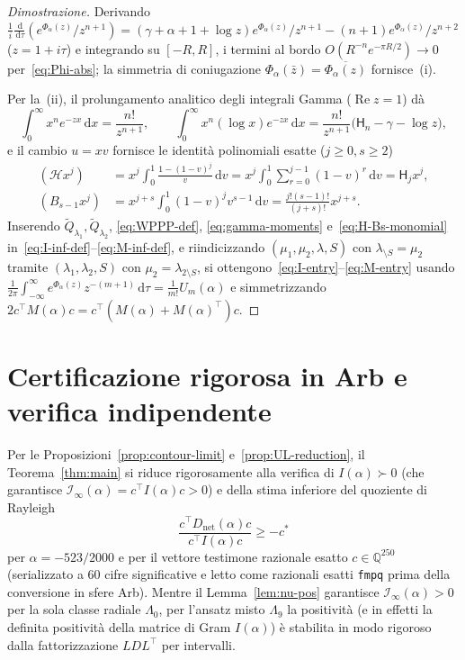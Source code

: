 \documentclass[11pt, reqno]{amsart}
\theoremstyle{remark}
\numberwithin{equation}{section}
\DeclareMathOperator{\re}{Re}
\newcommand{\Harm}{\mathsf{H}}
\newcommand{\cH}{\mathcal{H}}
\newcommand{\dd}{\,\mathrm{d}}
\begin{document}
\begin{proof}[Dimostrazione]
Derivando $\frac{1}{i}\frac{\dd}{\dd\tau}(e^{\Phi_\alpha(z)}/z^{n+1})
= (\gamma+\alpha+1+\log z)e^{\Phi_\alpha(z)}/z^{n+1} - (n+1)e^{\Phi_\alpha(z)}/z^{n+2}$ ($z=1+i\tau$)
e integrando su $[-R, R]$, i termini al bordo $O(R^{-n} e^{-\pi R/2}) \to 0$ per~\eqref{eq:Phi-abs}; la
simmetria di coniugazione $\Phi_\alpha(\bar{z}) = \overline{\Phi_\alpha(z)}$ fornisce~(i).

Per la~(ii), il prolungamento analitico degli integrali Gamma ($\re z = 1$) dà
\begin{equation}\label{eq:gamma-moments}
\int_0^\infty x^n e^{-zx}\dd x = \frac{n!}{z^{n+1}},
\qquad
\int_0^\infty x^n (\log x) e^{-zx}\dd x
= \frac{n!}{z^{n+1}}\bigl(\Harm_n - \gamma - \log z\bigr),
\end{equation}
e il cambio $u = x v$ fornisce le identità polinomiali esatte ($j \ge 0, s \ge 2$)
\begin{align}
(\cH x^j) &= x^j \int_0^1 \frac{1 - (1-v)^j}{v}\dd v
= x^j \int_0^1 \sum_{r=0}^{j-1}(1-v)^r\dd v = \Harm_j x^j, \nonumber\\
(B_{s-1} x^j) &= x^{j+s}\int_0^1 (1-v)^j v^{s-1}\dd v
= \frac{j!(s-1)!}{(j+s)!} x^{j+s}. \label{eq:H-Bs-monomial}
\end{align}
Inserendo $\widetilde{Q}_{\lambda_1}, \widetilde{Q}_{\lambda_2}$, \eqref{eq:WPPP-def}, \eqref{eq:gamma-moments}
e~\eqref{eq:H-Bs-monomial} in~\eqref{eq:I-inf-def}--\eqref{eq:M-inf-def}, e riindicizzando
$(\mu_1,\mu_2,\lambda,S)$ con $\lambda_{\setminus S} = \mu_2$ tramite $(\lambda_1,\lambda_2,S)$ con
$\mu_2 = \lambda_{2\setminus S}$, si ottengono~\eqref{eq:I-entry}--\eqref{eq:M-entry} usando
$\frac{1}{2\pi}\int_{-\infty}^\infty e^{\Phi_\alpha(z)} z^{-(m+1)}\dd\tau = \frac{1}{m!}U_m(\alpha)$
e simmetrizzando $2 c^\top M(\alpha) c = c^\top(M(\alpha)+M(\alpha)^\top)c$.
\end{proof}

\section{Certificazione rigorosa in Arb e verifica indipendente}\label{sec:cert}

Per le Proposizioni~\ref{prop:contour-limit} e~\ref{prop:UL-reduction}, il Teorema~\ref{thm:main} si
riduce rigorosamente alla verifica di $I(\alpha) \succ 0$ (che garantisce $\mathcal{I}_\infty(\alpha) = c^\top I(\alpha) c > 0$)
e della stima inferiore del quoziente di Rayleigh
\begin{equation}\label{eq:rq-cert}
\frac{c^\top D_{\mathrm{net}}(\alpha) c}{c^\top I(\alpha) c} \ge -c^*
\end{equation}
per $\alpha = -523/2000$ e per il vettore testimone razionale esatto $c \in \mathbb{Q}^{250}$ (serializzato
a $60$ cifre significative e letto come razionali esatti \texttt{fmpq} prima della conversione in sfere Arb).
Mentre il Lemma~\ref{lem:nu-pos} garantisce $\mathcal{I}_\infty(\alpha) > 0$ per la sola classe radiale
$\Lambda_0$, per l'ansatz misto $\Lambda_9$ la positività (e in effetti la definita positività della
matrice di Gram $I(\alpha)$) è stabilita in modo rigoroso dalla fattorizzazione $LDL^\top$ per intervalli.
\end{document}

